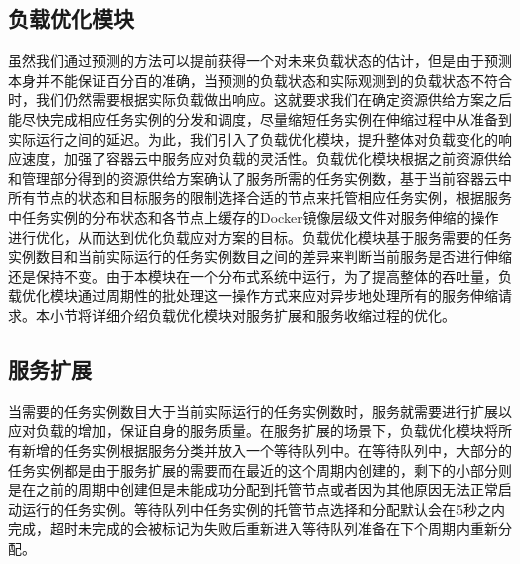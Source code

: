 \subsection{负载优化模块}\label{sec:scheduler}
虽然我们通过预测的方法可以提前获得一个对未来负载状态的估计，但是由于预测本身并不能保证百分百的准确，当预测的负载状态和实际观测到的负载状态不符合时，我们仍然需要根据实际负载做出响应。这就要求我们在确定资源供给方案之后能尽快完成相应任务实例的分发和调度，尽量缩短任务实例在伸缩过程中从准备到实际运行之间的延迟。为此，我们引入了负载优化模块，提升整体对负载变化的响应速度，加强了容器云中服务应对负载的灵活性。负载优化模块根据之前资源供给和管理部分得到的资源供给方案确认了服务所需的任务实例数，基于当前容器云中所有节点的状态和目标服务的限制选择合适的节点来托管相应任务实例，根据服务中任务实例的分布状态和各节点上缓存的Docker镜像层级文件对服务伸缩的操作进行优化，从而达到优化负载应对方案的目标。负载优化模块基于服务需要的任务实例数目和当前实际运行的任务实例数目之间的差异来判断当前服务是否进行伸缩还是保持不变。由于本模块在一个分布式系统中运行，为了提高整体的吞吐量，负载优化模块通过周期性的批处理这一操作方式来应对异步地处理所有的服务伸缩请求。本小节将详细介绍负载优化模块对服务扩展和服务收缩过程的优化。

\subsection{服务扩展}\label{sec:scaleout}
当需要的任务实例数目大于当前实际运行的任务实例数时，服务就需要进行扩展以应对负载的增加，保证自身的服务质量。在服务扩展的场景下，负载优化模块将所有新增的任务实例根据服务分类并放入一个等待队列中。在等待队列中，大部分的任务实例都是由于服务扩展的需要而在最近的这个周期内创建的，剩下的小部分则是在之前的周期中创建但是未能成功分配到托管节点或者因为其他原因无法正常启动运行的任务实例。等待队列中任务实例的托管节点选择和分配默认会在5秒之内完成，超时未完成的会被标记为失败后重新进入等待队列准备在下个周期内重新分配。

